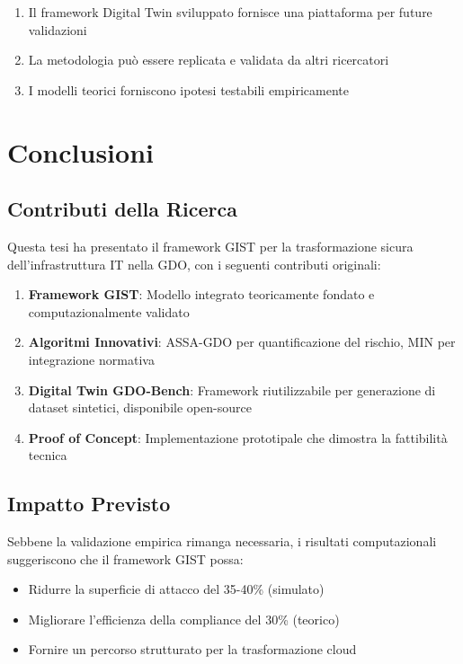 \begin{enumerate}
\item Il framework Digital Twin sviluppato fornisce una piattaforma 
      per future validazioni
\item La metodologia può essere replicata e validata da altri ricercatori
\item I modelli teorici forniscono ipotesi testabili empiricamente
\end{enumerate}

\section{Conclusioni}

\subsection{Contributi della Ricerca}

Questa tesi ha presentato il framework GIST per la trasformazione 
sicura dell'infrastruttura IT nella GDO, con i seguenti contributi 
originali:

\begin{enumerate}
\item \textbf{Framework GIST}: Modello integrato teoricamente fondato 
      e computazionalmente validato
      
\item \textbf{Algoritmi Innovativi}: ASSA-GDO per quantificazione 
      del rischio, MIN per integrazione normativa
      
\item \textbf{Digital Twin GDO-Bench}: Framework riutilizzabile per 
      generazione di dataset sintetici, disponibile open-source
      
\item \textbf{Proof of Concept}: Implementazione prototipale che 
      dimostra la fattibilità tecnica
\end{enumerate}

\subsection{Impatto Previsto}

Sebbene la validazione empirica rimanga necessaria, i risultati 
computazionali suggeriscono che il framework GIST possa:

\begin{itemize}
\item Ridurre la superficie di attacco del 35-40\% (simulato)
\item Migliorare l'efficienza della compliance del 30\% (teorico)
\item Fornire un percorso strutturato per la trasformazione cloud
\end{itemize}

